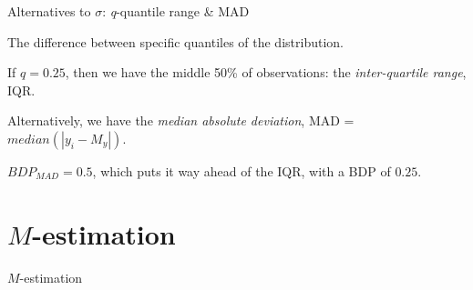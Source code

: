 \documentclass[12pt,english,pdf,xcolor=dvipsnames,aspectratio=169,handout]{beamer}\usepackage[]{graphicx}\usepackage[]{xcolor}
\begin{document}
\begin{frame}{Alternatives to $\sigma$: \textit{q}-quantile range \& MAD}

The difference between specific quantiles of the distribution.\bigskip

If $q=0.25$, then we have the middle 50\% of observations: the \textit{inter-quartile range}, IQR.\bigskip

Alternatively, we have the \textit{median absolute deviation}, MAD = $median(|y_i - M_y|)$.\bigskip

$BDP_{MAD} = 0.5$, which puts it way ahead of the IQR, with a BDP of $0.25$.

\end{frame}



\section{$M$-estimation}

\begin{frame}
\begin{center}
    \Huge $M$-estimation
\end{center}
\end{frame}
\end{document}
